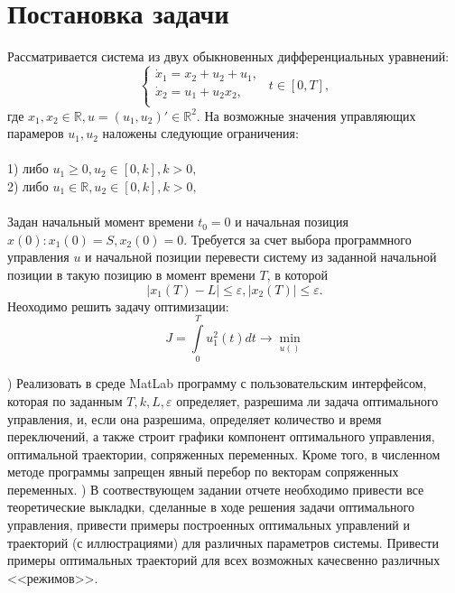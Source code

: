 \documentclass[12pt, fleqn]{article}
\begin{document}
\section {Постановка задачи}
Рассматривается система из двух обыкновенных дифференциальных уравнений:
\begin{equation}
\begin{cases}
\dot{x}_1 = x_2 + u_2 + u_1, \\
\dot{x}_2 = u_1 + u_2x_2,\\
\end{cases}
\ \ t\in [0, T],
\label{1}
\end{equation}
где $x_1, x_2 \in \mathbb{R}, u = (u_1, u_2)' \in \mathbb {R}^{2}.$ На возможные значения управляющих парамеров $u_1, u_2$ наложены следующие ограничения:\\\\
1) либо $u_1 \geqslant 0, u_2 \in [0, k], k > 0,$\\
2) либо $u_1 \in \mathbb{R}, u_2 \in [0, k], k > 0,$\\\\
Задан начальный момент времени $t_0 = 0$ и начальная позиция $x(0) : x_1(0) = S, x_2(0) = 0.$ Требуется за счет выбора программного управления $u$ и начальной позиции перевести систему из заданной начальной позиции в такую позицию в момент времени $T$, в которой 
$$|x_1(T) - L| \leqslant \varepsilon, |x_2(T)| \leqslant \varepsilon.$$ Неоходимо решить задачу оптимизации:
\begin{equation}
J = \int\limits_0^T u_1^2(t)dt \to \min\limits_{u()}
\label{2}
\end{equation}


) Реализовать в среде MatLab программу с пользовательским интерфейсом, которая по заданным $T, k, L, \varepsilon$ определяет, разрешима ли задача оптимального управления, и, если она разрешима,
определяет количество и время переключений, а также строит графики компонент оптимального управления, оптимальной траектории, сопряженных переменных. Кроме
того, в численном методе программы запрещен явный перебор по векторам сопряженных переменных.\newline
{}) В соотвествующем задании отчете необходимо привести все теоретические выкладки, сделанные в ходе решения задачи оптимального управления, привести примеры построенных оптимальных управлений и траекторий (с иллюстрациями) для различных параметров системы. Привести примеры оптимальных траекторий для всех возможных качесвенно различных <<режимов>>.
\end{document}
